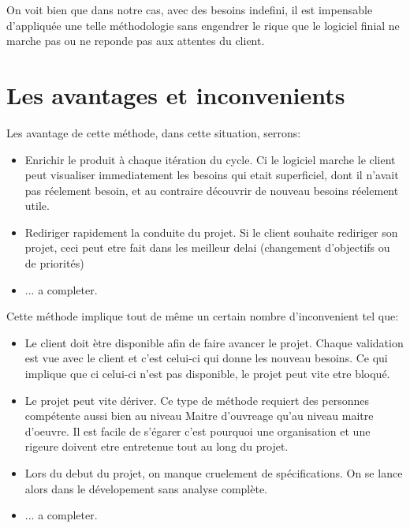 On voit bien que dans notre cas, avec des besoins indefini, il est impensable d'appliquée une telle méthodologie sans engendrer le rique que le logiciel finial ne marche pas ou ne reponde pas aux attentes du client.

\section{Les avantages et inconvenients}
Les avantage de cette méthode, dans cette situation, serrons:
\begin{itemize}
    \item Enrichir le produit à chaque itération du cycle. Ci le logiciel marche le client peut visualiser immediatement les besoins qui etait superficiel, dont il n'avait pas réelement besoin, et au contraire découvrir de nouveau besoins réelement utile.
    \item Rediriger rapidement la conduite du projet. Si le client souhaite rediriger son projet, ceci peut etre fait dans les meilleur delai (changement d'objectifs ou de priorités)
    \item ... a completer.
\end{itemize}\medskip
 
Cette méthode implique tout de même un certain nombre d'inconvenient tel que:
\begin{itemize}
    \item Le client doit ètre disponible afin de faire avancer le projet. Chaque validation est vue avec le client et c'est celui-ci qui donne les nouveau besoins. Ce qui implique que ci celui-ci n'est pas disponible, le projet peut vite etre bloqué. 
    \item Le projet peut vite dériver. Ce type de méthode requiert des personnes compétente aussi bien au niveau Maitre d'ouvreage qu'au niveau maitre d'oeuvre. Il est facile de s'égarer c'est pourquoi une organisation et une rigeure doivent etre entretenue tout au long du projet.
    \item Lors du debut du projet, on manque cruelement de spécifications. On se lance alors dans le dévelopement sans analyse complète.    
    \item ... a completer.
\end{itemize}\medskip







    
